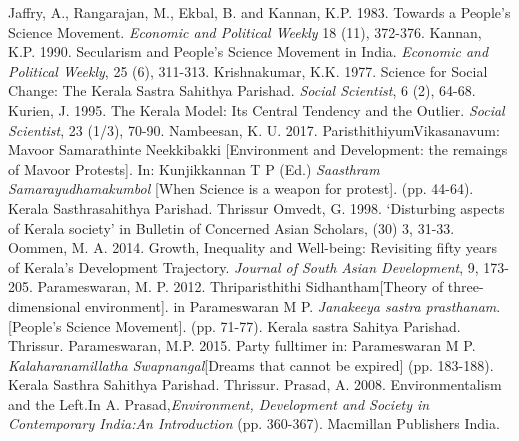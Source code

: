 \documentclass[twoside, 13pt]{article}
\begin{document}
{{{{{\begin{thebibliography}{99}
\bibitem{} Jaffry, A., Rangarajan, M., Ekbal, B. and Kannan, K.P. 1983. Towards a People's Science Movement. \textit{Economic and Political Weekly} 18 (11), 372-376.
\bibitem{} Kannan, K.P. 1990. Secularism and People's Science Movement in India. \textit{Economic and Political Weekly}, 25 (6), 311-313.
\bibitem{} Krishnakumar, K.K. 1977. Science for Social Change: The Kerala Sastra Sahithya Parishad. \textit{Social Scientist}, 6 (2), 64-68.
\bibitem{} Kurien, J. 1995. The Kerala Model: Its Central Tendency and the Outlier. \textit{Social Scientist}, 23 (1/3), 70-90.
\bibitem{} Nambeesan, K. U. 2017. ParisthithiyumVikasanavum: Mavoor Samarathinte Neekkibakki [Environment and Development: the remaings of Mavoor Protests]. In: Kunjikkannan T P (Ed.) \textit{Saasthram Samarayudhamakumbol} [When Science is a weapon for protest]. (pp. 44-64). Kerala Sasthrasahithya Parishad. Thrissur
\bibitem{} Omvedt, G. 1998. ‘Disturbing aspects of Kerala society’ in Bulletin of Concerned Asian Scholars, (30) 3, 31-33.
\bibitem{} Oommen, M. A. 2014. Growth, Inequality and Well-being: Revisiting fifty years of Kerala’s Development Trajectory. \textit{Journal of South Asian Development}, 9, 173-205.
\bibitem{} Parameswaran, M. P. 2012. Thriparisthithi Sidhantham[Theory of three-dimensional environment]. in Parameswaran M P. \textit{Janakeeya sastra prasthanam}. [People’s Science Movement]. (pp. 71-77). Kerala sastra Sahitya Parishad. Thrissur.
\bibitem{} Parameswaran, M.P. 2015. Party fulltimer in: Parameswaran M P. \textit{Kalaharanamillatha Swapnangal}[Dreams that cannot be expired] (pp. 183-188). Kerala Sasthra Sahithya Parishad. Thrissur.
\bibitem{} Prasad, A. 2008. Environmentalism and the Left.In A. Prasad,\textit{Environment, Development and Society in Contemporary India:An Introduction }(pp. 360-367). Macmillan Publishers India.

\newpage


\end{thebibliography}}}}}}
\end{document}
